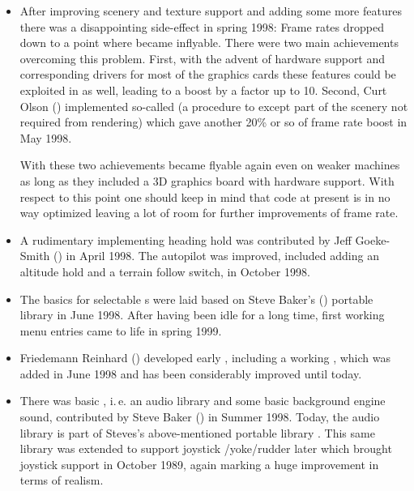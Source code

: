 \begin{itemize}
\item After improving scenery and
texture support and adding some more
 features there was a disappointing side-effect in spring 1998: Frame
 rates dropped down to a point where \FlightGear became inflyable. There
 were two main achievements overcoming this problem. First, with the advent
 of hardware  support and corresponding drivers for most of
 the graphics cards these features could be exploited in
 \FlightGear as well, leading to a  boost by a
 factor up to 10. Second, Curt Olson ()
 implemented so-called  (a procedure to except part of
 the scenery not required from  rendering) which gave another 20\% or so of
 frame rate boost in May 1998.

 With these two achievements \FlightGear became flyable again even on weaker
 machines as long as they included a 3D graphics board with
 hardware  support. With respect to this point one should keep in mind that code
 at present is in no way optimized leaving a lot of room for further
 improvements of frame rate.

\item A rudimentary  implementing heading hold was
contributed by Jeff Goeke-Smith () in
April 1998. The autopilot was improved, included adding an altitude hold and a terrain
follow switch, in October 1998.

\item The basics for selectable s were laid based on Steve Baker's
  () portable library  in June 1998. After having been idle for a
  long time, first working menu entries came to life in spring 1999.

\item Friedemann Reinhard 
()
 developed early , including a working , which was added in June 1998 and has been considerably improved until today.

\item There was basic , i.\,e. an audio library and some basic background engine sound, contributed by Steve
Baker () in Summer 1998. Today, the audio
library is part of Steves's above-mentioned portable library . This same
library was extended to support joystick /yoke/rudder later which brought \FlightGear
joystick support in October 1989, again marking a huge improvement in terms of realism.


\end{itemize}
